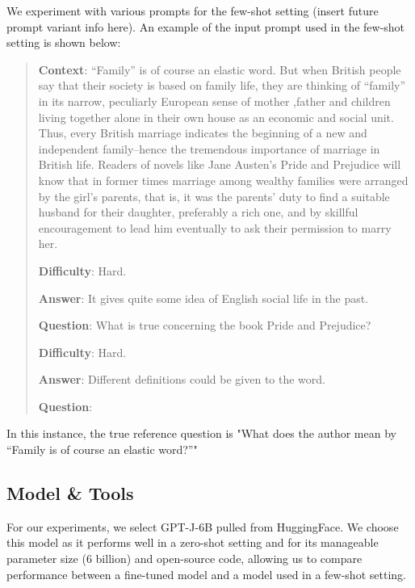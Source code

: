 \documentclass[11pt]{article}
\begin{document}
We experiment with various prompts for the few-shot setting (insert future prompt variant info here). An example of the input prompt used in the few-shot setting is shown below: 

\begin{small}

\begin{quote}
\textbf{Context}: ``Family'' is of course an elastic word. But when British people say that their society is based on family life, they are thinking of ``family'' in its narrow, peculiarly European sense of mother ,father and children living together alone in their own house as an economic and social unit. Thus, every British marriage indicates the beginning of a new and independent family--hence the tremendous importance of marriage in British life. Readers of novels like Jane Austen's Pride and Prejudice will know that in former times marriage among wealthy families were arranged by the girl's parents, that is, it was the parents' duty to find a suitable husband for their daughter, preferably a rich one, and by skillful encouragement to lead him eventually to ask their permission to marry her. 

\textbf{Difficulty}: Hard. 

\textbf{Answer}: It gives quite some idea of English social life in the past.

\textbf{Question}: What is true concerning the book Pride and Prejudice?

\textbf{Difficulty}: Hard. 

\textbf{Answer}: Different definitions could be given to the word.

\textbf{Question}: 

\end{quote}

\end{small}


In this instance, the true reference question is "What does the author mean by ``Family is of course an elastic word?''"

\subsection{Model \& Tools}

For our experiments, we select GPT-J-6B \citep{gpt-j:4} pulled from HuggingFace. We choose this model as it performs well in a zero-shot setting \citep{gpt-j:4} and for its manageable parameter size (6 billion) and open-source code, allowing us to compare performance between a fine-tuned model and a model used in a few-shot setting. 
\end{document}
